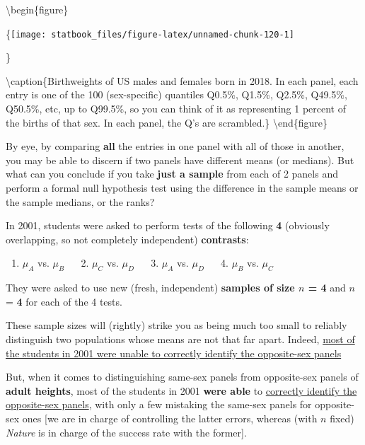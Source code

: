 \documentclass[]{book}
\providecommand{\tightlist}{%
  \setlength{\itemsep}{0pt}\setlength{\parskip}{0pt}}
\begin{document}
\textbackslash{}begin\{figure\}

\{\centering \texttt{[image: statbook\_files/figure-latex/unnamed-chunk-120-1]}

\}

\textbackslash{}caption\{Birthweights of US males and females born in 2018. In each panel, each entry is one of the 100 (sex-specific) quantiles Q0.5\%, Q1.5\%, Q2.5\%, Q49.5\%, Q50.5\%, etc, up to Q99.5\%, so you can think of it as representing 1 percent of the births of that sex. In each panel, the Q's are scrambled.\}\label{fig:unnamed-chunk-120}
\textbackslash{}end\{figure\}

By eye, by comparing \textbf{all} the entries in one panel with all of those in another, you may be able to discern if two panels have different means (or medians). But what can you conclude if you take \textbf{just a sample} from each of 2 panels and perform a formal null hypothesis test using the difference in the sample means or the sample medians, or the ranks?

In 2001, students were asked to perform tests of the following \textbf{4} (obviously overlapping, so not completely independent) \textbf{contrasts}:

\begin{enumerate}
\def\labelenumi{\arabic{enumi}.}
\tightlist
\item
  \(\mu_A\) vs. \(\mu_B\) \(\quad\) 2. \(\mu_C\) vs. \(\mu_D\) \(\quad\) 3. \(\mu_A\) vs. \(\mu_D\) \(\quad\) 4. \(\mu_B\) vs. \(\mu_C\)
\end{enumerate}

They were asked to use new (fresh, independent) \textbf{samples of size \(n\) = 4} and \(n\) = \textbf{4} for each of the 4 tests.

These sample sizes will (rightly) strike you as being much too small to reliably distinguish two populations whose means are not that far apart. Indeed, \href{http://www.medicine.mcgill.ca/epidemiology/hanley/c607/ch06/telling_sexes_apart.pdf\#page=1}{most of the students in 2001 were unable to correctly identify the
opposite-sex panels}

But, when it comes to distinguishing same-sex panels from opposite-sex panels of \textbf{adult heights}, most of the students in 2001 \textbf{were able} to \href{http://www.medicine.mcgill.ca/epidemiology/hanley/c607/ch06/telling_sexes_apart.pdf\#page=2}{correctly identify the opposite-sex panels}, with only a few mistaking the same-sex panels for opposite-sex ones {[}we are in charge of controlling the latter errors, whereas (with \(n\) fixed) \emph{Nature} is in charge of the success rate with the former{]}.
\end{document}
